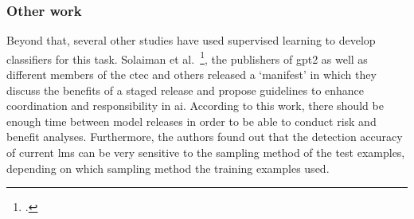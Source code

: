 \subsubsection{Other work}
\label{sub:other_work}

Beyond that, several other studies have used supervised learning to develop classifiers for this task. Solaiman et al.~\footcite{solaiman2019release}, the publishers of \gls{gpt2} as well as different members of the \gls{ctec} and others released a `manifest' in which they discuss the benefits of a staged release and propose guidelines to enhance coordination and responsibility in \gls{ai}. According to this work, there should be enough time between model releases in order to be able to conduct risk and benefit analyses. Furthermore, the authors found out that the detection accuracy of current \gls{lm}s can be very sensitive to the sampling method of the test examples, depending on which sampling method the training examples used.
